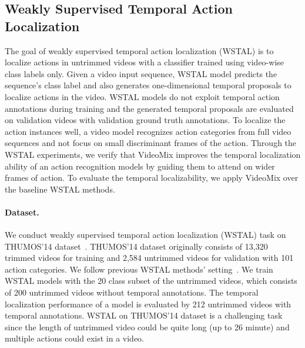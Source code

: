 
\subsection{Weakly Supervised Temporal Action Localization}
\label{section:experiments:wstal}

The goal of weakly supervised temporal action localization (WSTAL) is to localize actions in untrimmed videos with a classifier trained using video-wise class labels only. 
Given a video input sequence, WSTAL model predicts the sequence's class label and also generates one-dimensional temporal proposals to localize actions in the video. 
WSTAL models do not exploit temporal action annotations during training and the generated temporal proposals are evaluated on validation videos with validation ground truth annotations. 
To localize the action instances well, a video model recognizes action categories from full video sequences and not focus on small discriminant frames of the action.
Through the WSTAL experiments, we verify that VideoMix improves the temporal localization ability of an action recognition models by guiding them to attend on wider frames of action. 
To evaluate the temporal localizability, we apply VideoMix over the baseline WSTAL methods.






\paragraph{Dataset.}
We conduct weakly supervised temporal action localization (WSTAL) task on THUMOS’14 dataset~\cite{THUMOS14}. 
THUMOS’14 dataset originally consists of 13,320 trimmed videos for training and 2,584 untrimmed videos for validation with 101 action categories.
We follow previous WSTAL methods' setting~\cite{lee2020bas,nguyen2018weakly,shou2018autoloc}.
We train WSTAL models with the 20 class subset of the untrimmed videos, which consists of 200 untrimmed videos without temporal annotations. 
The temporal localization performance of a model is evaluated by 212 untrimmed videos with temporal annotations. 
WSTAL on THUMOS’14 dataset is a challenging task since the length of untrimmed video could be quite long (up to 26 minute) and multiple actions could exist in a video. 

